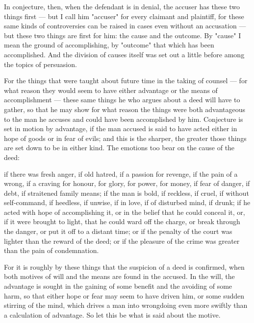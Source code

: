  In conjecture, then, when the defendant is in denial, the accuser has these two things first — but I call him "accuser" for every claimant and plaintiff, for these same kinds of controversies can be raised in cases even without an accusation — but these two things are first for him: the cause and the outcome. By "cause" I mean the ground of accomplishing, by "outcome" that which has been accomplished. And the division of causes itself was set out a little before among the topics of persuasion.

 For the things that were taught about future time in the taking of counsel — for what reason they would seem to have either advantage or the means of accomplishment — these same things he who argues about a deed will have to gather, so that he may show for what reason the things were both advantageous to the man he accuses and could have been accomplished by him. Conjecture is set in motion by advantage, if the man accused is said to have acted either in hope of goods or in fear of evils; and this is the sharper, the greater those things are set down to be in either kind. The emotions too bear on the cause of the deed:

 if there was fresh anger, if old hatred, if a passion for revenge, if the pain of a wrong, if a craving for honour, for glory, for power, for money, if fear of danger, if debt, if straitened family means; if the man is bold, if reckless, if cruel, if without self-command, if heedless, if unwise, if in love, if of disturbed mind, if drunk; if he acted with hope of accomplishing it, or in the belief that he could conceal it, or, if it were brought to light, that he could ward off the charge, or break through the danger, or put it off to a distant time; or if the penalty of the court was lighter than the reward of the deed; or if the pleasure of the crime was greater than the pain of condemnation.

 For it is roughly by these things that the suspicion of a deed is confirmed, when both motives of will and the means are found in the accused. In the will, the advantage is sought in the gaining of some benefit and the avoiding of some harm, so that either hope or fear may seem to have driven him, or some sudden stirring of the mind, which drives a man into wrongdoing even more swiftly than a calculation of advantage. So let this be what is said about the motive.

